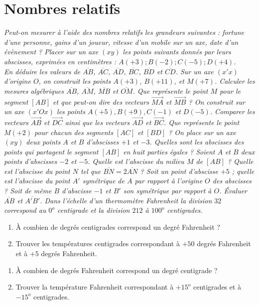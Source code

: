 
 \chapter{Nombres relatifs}
  \begin{itemize}
  \it Peut-on mesurer à l'aide des nombres relatifs les 
  grandeurs suivantes : fortune d'une personne, gains d'un
  joueur, vitesse d'un mobile sur un axe, date d'un évènement ?
  \it Placer sur un axe $(xy)$ les points suivants donnés par leurs abscisses, exprimées en centimètres : $A(+3); B(-2); C(-5); D(+4)$.\\En déduire les valeurs de $\overline{AB}$, $\overline{AC}$, $\overline{AD}$, $\overline{BC}$, $\overline{BD}$ et $\overline{CD}$.
  \it Sur un axe $(x'x)$ d'origine $O$, on construit les points $A(+3)$, $B(+11)$, et $M(+7)$. Calculer les mesures algébriques $\overline{AB}$, $\overline{AM}$, $\overline{MB}$ et $\overline{OM}$. Que représente le point $M$ pour le segment $[AB]$ et que peut-on dire des vecteurs $\overrightarrow{MA}$ et $\overrightarrow{MB}$ ? 
  \it On construit sur un axe $(x'Ox)$ les points 
  $A(+5), B(+9), C(-1)$ et $D(-5)$. Comparer les vecteurs $\overrightarrow{AB}$ et $\overrightarrow{DC}$ ainsi que les vecteurs $\overrightarrow{AD}$ et $\overrightarrow{BC}$. Que représente le point $M(+2)$ pour chacun des segments $[AC]$ et $[BD]$ ? 
  \it On place sur un axe $(xy)$ deux points $A$ et $B$ d'abscisses $+1$ et $-3$. Quelles sont les abscisses des points qui partagent le segment $[AB]$ en huit parties égales ? 
  \it Soient $A$ et $B$ deux points d'abscisses $-2$ et $-5$. Quelle est l'abscisse du milieu $M$ de $[AB]$ ? Quelle est l'abscisse du point $N$ tel que $\overline{BN} = 2\overline{AN}$ ?
  \it Soit un point d'abscisse $+5$ ; quelle est l'abscisse du point $A'$ symétrique de $A$ par rapport à l'origine $O$ des abscisses ? Soit de même $B$ d'abscisse $-1$ et $B'$ son symétrique par rapport à $O$. Évaluer $\overline{AB}$ et $\overline{A'B'}$. 
  \it Dans l'échelle d'un thermomètre Fahrenheit la division $32$ correspond au $0^o$ centigrade et la division $212$ à $100^o$ centigrades. 
  \begin{enumerate}
  \item À combien de degrés centigrades correspond un degré Fahrenheit ? 
  \item Trouver les températures centigrades correspondant à $+50$ degrés Fahrenheit et à $+5$ degrés Fahrenheit. 
  \end{enumerate}
  \it \begin{enumerate}
  \item À combien de degrés Fahrenheit correspond un degré centigrade ?
  \item Trouver la température Fahrenheit correspondant à
  $+15^o$ centigrades et à $-15^o$ centigrades.
  \end{enumerate}
  \end{itemize}